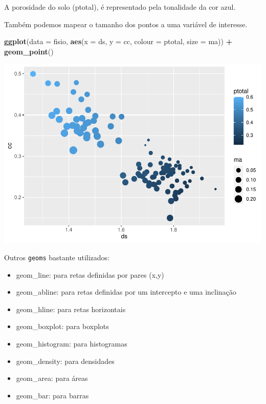 \documentclass[]{book}
\newenvironment{Shaded}{\begin{snugshade}}{\end{snugshade}}
\newcommand{\DataTypeTok}[1]{\textcolor[rgb]{0.13,0.29,0.53}{#1}}
\newcommand{\KeywordTok}[1]{\textcolor[rgb]{0.13,0.29,0.53}{\textbf{#1}}}
\newcommand{\NormalTok}[1]{#1}
\newcommand{\OperatorTok}[1]{\textcolor[rgb]{0.81,0.36,0.00}{\textbf{#1}}}
\newcommand{\StringTok}[1]{\textcolor[rgb]{0.31,0.60,0.02}{#1}}
\providecommand{\tightlist}{%
  \setlength{\itemsep}{0pt}\setlength{\parskip}{0pt}}
\begin{document}
A porosidade do solo (ptotal), é representado pela tonalidade da cor azul.

Também podemos mapear o tamanho dos pontos a uma variável de interesse.

\begin{Shaded}
\begin{Highlighting}[]
\KeywordTok{ggplot}\NormalTok{(}\DataTypeTok{data =}\NormalTok{ fisio, }\KeywordTok{aes}\NormalTok{(}\DataTypeTok{x =}\NormalTok{ ds, }\DataTypeTok{y =}\NormalTok{ cc, }\DataTypeTok{colour =}\NormalTok{ ptotal, }\DataTypeTok{size =}\NormalTok{ ma)) }\OperatorTok{+}
\StringTok{  }\KeywordTok{geom_point}\NormalTok{()}
\end{Highlighting}
\end{Shaded}

\includegraphics{TudodoR_files/figure-latex/unnamed-chunk-189-1.pdf}

Outros \texttt{geoms} bastante utilizados:

\begin{itemize}
\tightlist
\item
  geom\_line: para retas definidas por pares (x,y)
\item
  geom\_abline: para retas definidas por um intercepto e uma inclinação
\item
  geom\_hline: para retas horizontais
\item
  geom\_boxplot: para boxplots
\item
  geom\_histogram: para histogramas
\item
  geom\_density: para densidades
\item
  geom\_area: para áreas
\item
  geom\_bar: para barras
\end{itemize}
\end{document}
